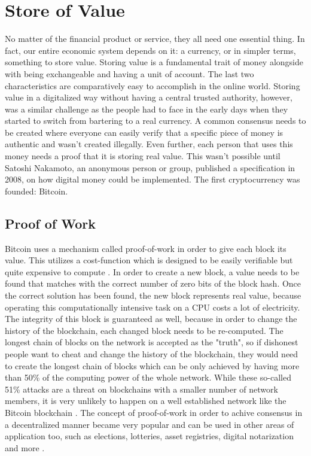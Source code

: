\section{Store of Value}
\label{sec:storeofvalue}
No matter of the financial product or service, they all need one essential thing. In fact, our entire economic system depends on it: a currency, or in simpler terms, something to store value. Storing value is a fundamental trait of money alongside with being exchangeable and having a unit of account. The last two characteristics are comparatively easy to accomplish in the online world. Storing value in a digitalized way without having a central trusted authority, however, was a similar challenge as the people had to face in the early days when they started to switch from bartering to a real currency. A common consensus needs to be created where everyone can easily verify that a specific piece of money is authentic and wasn't created illegally. Even further, each person that uses this money needs a proof that it is storing real value. This wasn't possible until Satoshi Nakamoto, an anonymous person or group, published a specification \cite{Nakamoto2008} in 2008, on how digital money could be implemented. The first cryptocurrency was founded: Bitcoin.

\subsection{Proof of Work}
Bitcoin uses a mechanism called proof-of-work in order to give each block its value. This utilizes a cost-function which is designed to be easily verifiable but quite expensive to compute \cite{Back2002}. In order to create a new block, a value needs to be found that matches with the correct number of zero bits of the block hash. Once the correct solution has been found, the new block represents real value, because operating this computationally intensive task on a CPU costs a lot of electricity. The integrity of this block is guaranteed as well, because in order to change the history of the blockchain, each changed block needs to be re-computed. The longest chain of blocks on the network is accepted as the "truth", so if dishonest people want to cheat and change the history of the blockchain, they would need to create the longest chain of blocks which can be only achieved by having more than 50\% of the computing power of the whole network. While these so-called 51\% attacks are a threat on blockchains with a smaller number of network members, it is very unlikely to happen on a well established network like the Bitcoin blockchain \cite{Swan2015}. The concept of proof-of-work in order to achive consensus in a decentralized manner became very popular and can be used in other areas of application too, such as elections, lotteries, asset registries, digital notarization and more \cite{Antonopoulos2017}.

